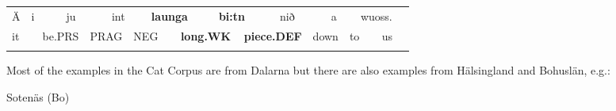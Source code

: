\begin{tabular}{llllllllllllllllll}
\lsptoprule
Ä & \multicolumn{2}{l}{i

} & \multicolumn{2}{l}{ju

} & \multicolumn{2}{l}{int

} & \multicolumn{2}{l}{{\bfseries launga}

} & \multicolumn{2}{l}{{\bfseries bi:tn}

} & \multicolumn{2}{l}{nið

} & \multicolumn{2}{l}{a

} & \multicolumn{2}{l}{wuoss.

} & \\
\multicolumn{2}{l}{it

} & \multicolumn{2}{l}{be.PRS

} & \multicolumn{2}{l}{PRAG

} & \multicolumn{2}{l}{NEG

} & \multicolumn{2}{l}{{\bfseries long.WK}

} & \multicolumn{2}{l}{{\bfseries piece.DEF}

} & \multicolumn{2}{l}{down

} & \multicolumn{2}{l}{to

} & \multicolumn{2}{l}{us

}\\
\lspbottomrule
\end{tabular}

Most of the examples in the Cat Corpus are from Dalarna but there are also examples from Hälsingland and Bohuslän, e.g.:

\begin{listWWNumileveli}
\item {}

\begin{styleExample}
Sotenäs (Bo)

\end{styleExample}

\end{listWWNumileveli}

